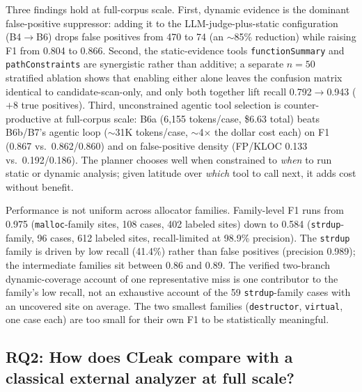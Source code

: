 \documentclass[a4paper]{llncs}
\begin{document}
Three findings hold at full-corpus scale. First, dynamic evidence is the
dominant false-positive suppressor: adding it to the
LLM-judge-plus-static configuration (B4$\to$B6) drops false positives
from 470 to 74 (an $\sim$85\% reduction) while raising F1 from 0.804 to
0.866. Second, the static-evidence tools \texttt{functionSummary} and
\texttt{pathConstraints} are synergistic rather than additive; a
separate $n{=}50$ stratified ablation shows that enabling either alone
leaves the confusion matrix identical to candidate-scan-only, and only
both together lift recall 0.792$\to$0.943 ($+8$ true positives). Third,
unconstrained agentic tool selection is counter-productive at
full-corpus scale: B6a (6{,}155 tokens/case, \$6.63 total) beats
B6b/B7's agentic loop ($\sim$31K tokens/case, $\sim$4$\times$ the
dollar cost each) on F1 (0.867 vs.\ 0.862/0.860) and on false-positive
density (FP/KLOC 0.133 vs.\ 0.192/0.186). The planner chooses well when
constrained to \emph{when} to run static or dynamic analysis; given
latitude over \emph{which} tool to call next, it adds cost without
benefit.

Performance is not uniform across allocator families. Family-level F1
runs from 0.975 (\texttt{malloc}-family sites, 108 cases, 402 labeled
sites) down to 0.584 (\texttt{strdup}-family, 96 cases, 612 labeled
sites, recall-limited at 98.9\% precision). The \texttt{strdup} family
is driven by low
recall (41.4\%)
rather than false positives (precision 0.989); the
intermediate families sit between 0.86 and 0.89. The verified two-branch
dynamic-coverage account of one representative miss is one contributor
to the family's low recall, not an exhaustive account of the 59
\texttt{strdup}-family cases with an uncovered site on average. The two
smallest families (\texttt{destructor},
\texttt{virtual}, one case each) are too small for their own F1 to be
statistically meaningful.

\noindent{}

\subsection{RQ2: How does CLeak compare with a classical external analyzer at full scale?}
\label{sec:eval-external}
\end{document}
